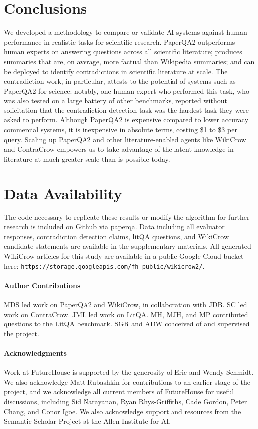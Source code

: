 \documentclass{article}
\begin{document}
\begin{bibunit}[unsrt]
\section{Conclusions}

We developed a methodology to compare or validate AI systems against human performance in realistic tasks for scientific research. PaperQA2 outperforms human experts on answering questions across all scientific literature; produces summaries that are, on average, more factual than Wikipedia summaries; and can be deployed to identify contradictions in scientific literature at scale. The contradiction work, in particular, attests to the potential of systems such as PaperQA2 for science: notably, one human expert who performed this task, who was also tested on a large battery of other benchmarks, reported without solicitation that the contradiction detection task was the hardest task they were asked to perform. Although PaperQA2 is expensive compared to lower accuracy commercial systems, it is inexpensive in absolute terms, costing \$1 to \$3 per query. Scaling up PaperQA2 and other literature-enabled agents like WikiCrow and ContraCrow empowers us to take advantage of the latent knowledge in literature at much greater scale than is possible today.


\section{Data Availability}

The code necessary to replicate these results or modify the algorithm for further research is included on Github via \href{https://github.com/Future-House/paper-qa}{paperqa}. Data including all evaluator responses, contradiction detection claims, litQA questions, and WikiCrow candidate statements are available in the supplementary materials. All generated WikiCrow articles for this study are available in a public Google Cloud bucket here: \texttt{https://storage.googleapis.com/fh-public/wikicrow2/}.

\paragraph{Author Contributions} MDS led work on PaperQA2 and WikiCrow, in collaboration with JDB. SC led work on ContraCrow. JML led work on LitQA. MH, MJH, and MP contributed questions to the LitQA benchmark. SGR and ADW conceived of and supervised the project.

\paragraph{Acknowledgments} Work at FutureHouse is supported by the generosity of Eric and Wendy Schmidt. We also acknowledge Matt Rubashkin for contributions to an earlier stage of the project, and we acknowledge all current members of FutureHouse for useful discussions, including Sid Narayanan, Ryan Rhys-Griffiths, Cade Gordon, Peter Chang, and Conor Igoe. We also acknowledge support and resources from the Semantic Scholar Project at the Allen Institute for AI.


\end{bibunit}
\end{document}
